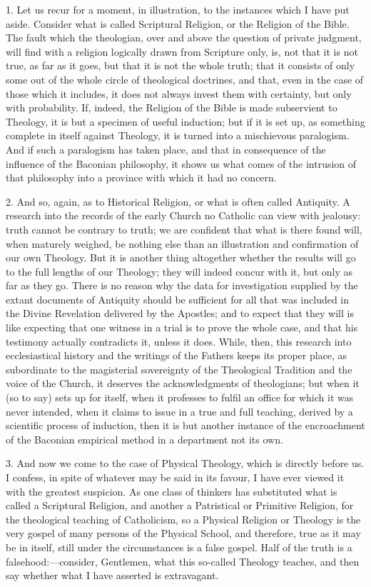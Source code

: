 1. Let us recur for a moment, in illustration, to the instances
which I have put aside. Consider what is called Scriptural Religion,
or the Religion of the Bible. The fault which the theologian, over and
above the question of private judgment, will find with a religion
logically drawn from Scripture only, is, not that it is not true, as
far as it goes, but that it is not the whole truth; that it consists
of only some out of the whole circle of theological doctrines, and
that, even in the case of those which it includes, it does not always
invest them with certainty, but only with probability. If, indeed, the
Religion of the Bible is made subservient to Theology, it is but a
specimen of useful induction; but if it is set up, as something
complete in itself against Theology, it is turned into a mischievous
paralogism. And if such a paralogism has taken place, and that
in consequence of the influence of the Baconian philosophy, it shows
us what comes of the intrusion of that philosophy into a province with
which it had no concern.

2. And so, again, as to Historical Religion, or what is often
called Antiquity. A research into the records of the early Church no
Catholic can view with jealousy: truth cannot be contrary to truth; we
are confident that what is there found will, when maturely weighed, be
nothing else than an illustration and confirmation of our own
Theology. But it is another thing altogether whether the results will
go to the full lengths of our Theology; they will indeed concur with
it, but only as far as they go. There is no reason why the data for
investigation supplied by the extant documents of Antiquity should be
sufficient for all that was included in the Divine Revelation
delivered by the Apostles; and to expect that they will is like
expecting that one witness in a trial is to prove the whole case, and
that his testimony actually contradicts it, unless it does. While,
then, this research into ecclesiastical history and the writings of
the Fathers keeps its proper place, as subordinate to the magisterial
sovereignty of the Theological Tradition and the voice of the Church,
it deserves the acknowledgments of theologians; but when it (so to
say) sets up for itself, when it professes to fulfil an office for
which it was never intended, when it claims to issue in a true and
full teaching, derived by a scientific process of induction, then it
is but another instance of the encroachment of the Baconian empirical
method in a department not its own.

3. And now we come to the case of Physical Theology, which is
directly before us. I confess, in spite of whatever may be said in its
favour, I have ever viewed it with the greatest suspicion. As
one class of thinkers has substituted what is called a Scriptural
Religion, and another a Patristical or Primitive Religion, for the
theological teaching of Catholicism, so a Physical Religion or
Theology is the very gospel of many persons of the Physical School,
and therefore, true as it may be in itself, still under the
circumstances is a false gospel. Half of the truth is a falsehood:—consider,
Gentlemen, what this so-called Theology teaches, and then say whether
what I have asserted is extravagant.

